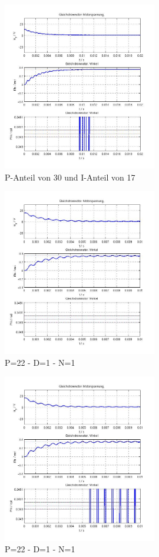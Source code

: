 \begin{figure}[ht]
	\centering
	\includegraphics[width=0.6\textwidth]{PI-P30I17.jpg}
	\caption{P-Anteil von 30 und I-Anteil von 17}
	\label{p30i17}
\end{figure}


\begin{figure}[ht]
	\centering
	\includegraphics[width=0.6\textwidth]{PD-P22D1N1.jpg}
	\caption{P=22 - D=1 - N=1}
	\label{p22d1n1}
\end{figure}


\begin{figure}[ht]
	\centering
	\includegraphics[width=0.6\textwidth]{PD-P23D1N1.jpg}
	\caption{P=22 - D=1 - N=1}
	\label{p23d1n1}
\end{figure}


